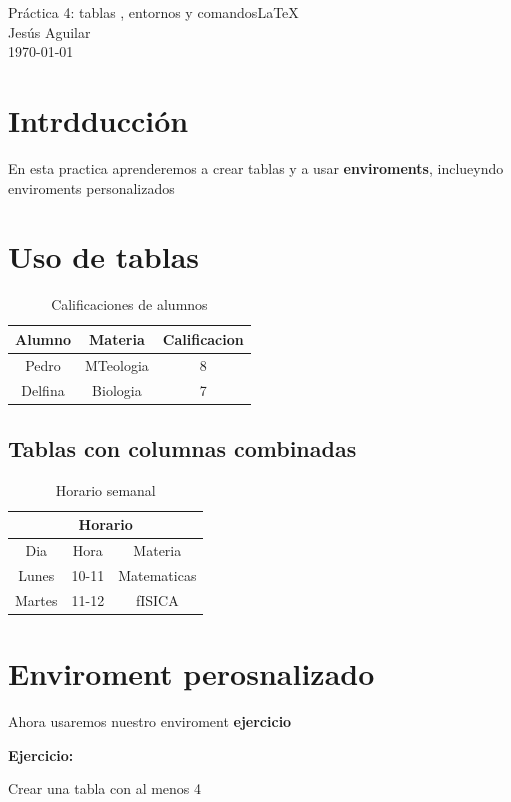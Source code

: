 \documentclass[12pt]{article}
\newcommand{\minombre}{Jesús Aguilar}
\newcommand{\nombrepractica}{Práctica 4: tablas , entornos y comandos}
\newenvironment{ejercicio}
{
   \vspace{0.3cm}
   \noindent\textbf{Ejercicio:}
   \begin{itshape}  %

}
{
\end{itshape}
\vspace{0.3cm}
}
\begin{document}
\begin{center}
\vspace*{4cm}
{\LARGE \nombrepractica \LaTeX}\\[0.5cm]
\vspace{2.5cm}
{\large \minombre}\\[0.5cm]
\vspace{2.5cm}
{\large \today}
\end{center}

\section{Intrdducción}
En esta practica aprenderemos a crear tablas y a usar \textbf{enviroments}, inclueyndo enviroments personalizados

\section{Uso de tablas}
\begin{table}[h]
    \centering
    \begin{tabular}{c|c|c}
         Alumno&Materia&Calificacion\\
         \hline
         Pedro&MTeologia&8\\
         Delfina&Biologia&7
    \end{tabular}{}
    \caption{Calificaciones de alumnos}
    \label{tab:calificaciones}

\end{table}

\subsection{Tablas con columnas combinadas}

\begin{table}[h]
    \centering
    \begin{tabular}{c|c|c}
         \hline
         \multicolumn{3}{|c|}{Horario}\\ \hline
         Dia&Hora&Materia \\ \hline
         Lunes&10-11&Matematicas \\ \hline
         Martes&11-12&fISICA \\ \hline
    \end{tabular}
    \caption{Horario semanal}
    \label{tab:Horario}
\end{table}
\section{Enviroment perosnalizado}
Ahora usaremos nuestro enviroment \textbf{ejercicio}

\begin{ejercicio}
    Crear una tabla con al menos 4
    
\end{ejercicio}
\end{document}
